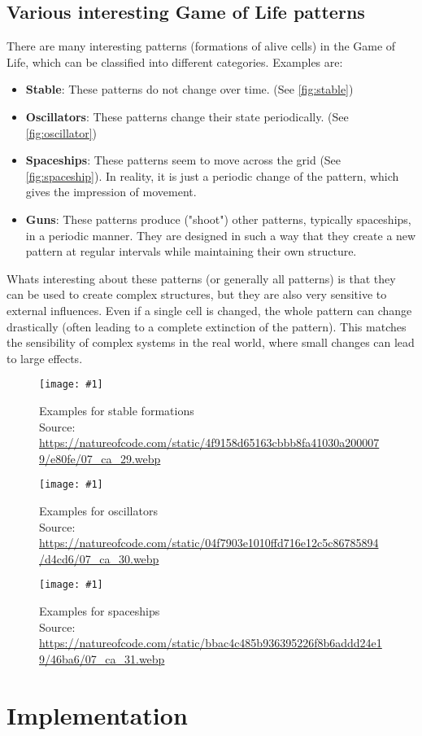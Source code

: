 \documentclass[a4paper,12pt]{llncs}
\numberwithin{equation}{section}
\newcommand{\imagewithwidth}[5]{
  \begin{figure}[htbp]%
    \begin{center}%
      \texttt{[image: \#1]}%
      \caption[#5]{#4}%
      \label{#3}%
    \end{center}%
  \end{figure}
}
\begin{document}
\subsection{Various interesting Game of Life patterns}
There are many interesting patterns (formations of alive cells) in the Game of Life, which can be classified into different categories. Examples are:
\begin{itemize}
  \item \textbf{Stable}: These patterns do not change over time. (See \autoref{fig:stable})
  \item \textbf{Oscillators}: These patterns change their state periodically. (See \autoref{fig:oscillator})
  \item \textbf{Spaceships}: These patterns seem to move across the grid (See \autoref{fig:spaceship}). In reality, it is just a periodic change of the pattern, which gives the impression of movement.
  \item \textbf{Guns}: These patterns produce ("shoot") other patterns, typically spaceships, in a periodic manner. They are designed in such a way that they create a new pattern at regular intervals while maintaining their own structure.
\end{itemize}
Whats interesting about these patterns (or generally all patterns) is that they can be used to create complex structures,
but they are also very sensitive to external influences. Even if a single cell is changed, the whole pattern can change drastically (often leading to a complete extinction of the pattern).
This matches the sensibility of complex systems in the real world, where small changes can lead to large effects.
\imagewithwidth{figures/stable}{0.7\textwidth}{fig:stable}{Examples for stable formations\\Source: \url{https://natureofcode.com/static/4f9158d65163cbbb8fa41030a2000079/e80fe/07_ca_29.webp}}{}
\imagewithwidth{figures/oscillator}{0.7\textwidth}{fig:oscillator}{Examples for oscillators\\Source: \url{https://natureofcode.com/static/04f7903e1010ffd716e12c5c86785894/d4cd6/07_ca_30.webp}}{}
\imagewithwidth{figures/spaceship}{0.7\textwidth}{fig:spaceship}{Examples for spaceships\\Source: \url{https://natureofcode.com/static/bbac4c485b936395226f8b6addd24e19/46ba6/07_ca_31.webp}}{}

\section{Implementation}
\end{document}
